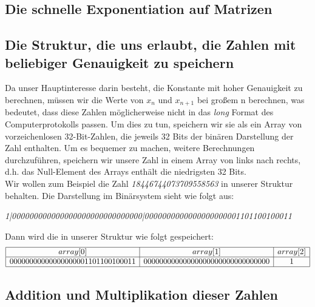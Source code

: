 \documentclass[course=erap]{aspdoc}
\begin{document}
\subsection{Die schnelle Exponentiation auf Matrizen}%
\subsection{Die Struktur, die uns erlaubt, die Zahlen mit beliebiger Genauigkeit zu speichern}%
Da unser Hauptinteresse darin besteht, die Konstante mit hoher Genauigkeit zu berechnen, müssen wir die Werte von $x_n$ und $x_{n+1}$ bei großem n berechnen, was bedeutet, dass diese Zahlen möglicherweise nicht in das \textit{long} Format des Computerprotokolls passen. Um dies zu tun, speichern wir sie als ein Array von vorzeichenlosen 32-Bit-Zahlen, die jeweils 32 Bits der binären Darstellung der Zahl enthalten. Um es bequemer zu machen, weitere Berechnungen durchzuführen, speichern wir unsere Zahl in einem Array von links nach rechts, d.h. das Null-Element des Arrays enthält die niedrigsten 32 Bits.\\
Wir wollen zum Beispiel die Zahl \textit{18446744073709558563} in unserer Struktur behalten. Die Darstellung im Binärsystem sieht wie folgt aus: \\
\centerline{\textit{1|000000000000000000000000000000|0000000000000000000001101100100011}}
Dann wird die in unserer Struktur wie folgt gespeichert:
\begin{equation*}
\begin{array}{|c|c|c|}\hline
array[0] & array[1] & array[2]\\
\hline
00000000000000000001101100100011 & 00000000000000000000000000000000 & 1 \\
\hline
\end{array}
\end{equation*}
\subsection{Addition und Multiplikation dieser Zahlen}%
\end{document}
